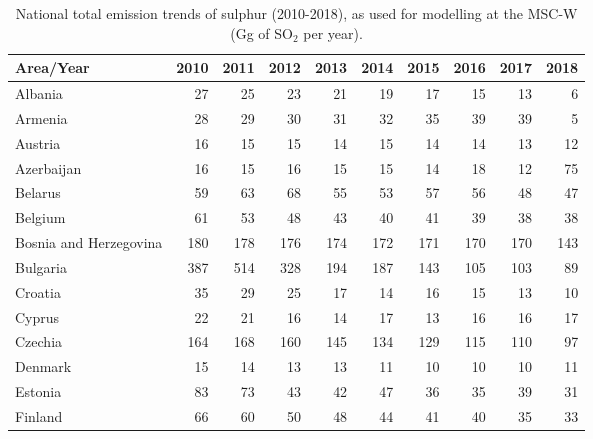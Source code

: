  \begin{table}
 \caption{National total emission trends of sulphur (2010-2018), as used for modelling at the MSC-W (Gg of SO$_2$ per year).}
 
 \vspace{15pt}
 
 \scriptsize
 \centering
 \begin{tabular}{|l|r|r|r|r|r|r|r|r|r|}
 \hline
                     Area/Year&   2010&   2011&   2012&   2013&   2014&   2015&   2016&   2017&   2018\\\hline\hline
                       Albania&     27&     25&     23&     21&     19&     17&     15&     13&      6\\\hline
                       Armenia&     28&     29&     30&     31&     32&     35&     39&     39&      5\\\hline
                       Austria&     16&     15&     15&     14&     15&     14&     14&     13&     12\\\hline
                    Azerbaijan&     16&     15&     16&     15&     15&     14&     18&     12&     75\\\hline
                       Belarus&     59&     63&     68&     55&     53&     57&     56&     48&     47\\\hline
                       Belgium&     61&     53&     48&     43&     40&     41&     39&     38&     38\\\hline
        Bosnia and Herzegovina&    180&    178&    176&    174&    172&    171&    170&    170&    143\\\hline
                      Bulgaria&    387&    514&    328&    194&    187&    143&    105&    103&     89\\\hline
                       Croatia&     35&     29&     25&     17&     14&     16&     15&     13&     10\\\hline
                        Cyprus&     22&     21&     16&     14&     17&     13&     16&     16&     17\\\hline
                       Czechia&    164&    168&    160&    145&    134&    129&    115&    110&     97\\\hline
                       Denmark&     15&     14&     13&     13&     11&     10&     10&     10&     11\\\hline
                       Estonia&     83&     73&     43&     42&     47&     36&     35&     39&     31\\\hline
                       Finland&     66&     60&     50&     48&     44&     41&     40&     35&     33\\\hline

\end{tabular}
\end{table}
